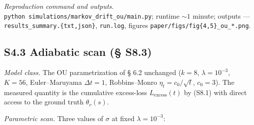 \documentclass[pdflatex,sn-mathphys-ay]{sn-jnl}
\begin{document}
\emph{Reproduction command and outputs.} \texttt{python\ simulations/markov\_drift\_ou/main.py}; runtime \(\sim 1\) minute; outputs --- \texttt{results\_summary.\{txt,json\}}, \texttt{run.log}, figures \texttt{paper/figs/fig\{4,5\}\_ou\_*.png}.



\subsection*{S4.3 Adiabatic scan (§ S8.3)}\label{s4.3-adiabatic-scan-s8.3}



\emph{Model class.} The OU parametrization of § 6.2 unchanged (\(k = 8\), \(\lambda = 10^{-3}\), \(K = 56\), Euler--Maruyama \(\Delta t = 1\), Robbins--Monro \(\eta_t = c_0 / \sqrt{t}\), \(c_0 = 3\)). The measured quantity is the cumulative excess-loss \(L_{\text{excess}}(t)\) by (S8.1) with direct access to the ground truth \(\theta_v(s)\).



\emph{Parametric scan.} Three values of \(\sigma\) at fixed \(\lambda = 10^{-3}\):
\end{document}
